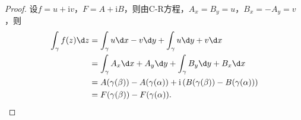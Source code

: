 \documentclass[12pt]{ctexart}
\theoremstyle{definition}
\theoremstyle{plain}
\newcommand{\iu}{\mathrm{i}}
\begin{document}
	\begin{proof}
		设$f=u+\iu v$，$F=A+\iu B$，则由C-R方程，$A_x=B_y=u$，$B_x=-A_y=v$，则
		\begin{equation}
			\begin{aligned}
				\int_{\gamma}f(z)\d z&=\int_{\gamma}u\d x-v\d y+\int_{\gamma}u\d y+v\d x\\
				&=\int_{\gamma}A_x\d x+A_y\d y+\int_{\gamma}B_y\d y+B_x\d x\\
				&=A(\gamma(\beta))-A(\gamma(\alpha))+\iu\left(B(\gamma(\beta))-B(\gamma(\alpha))\right)\\
				&=F(\gamma(\beta))-F(\gamma(\alpha)).
			\end{aligned}
		\end{equation}
	\end{proof}
\end{document}

